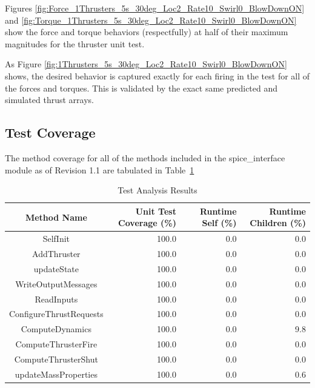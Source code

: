 \begin{enumerate}
	Figures \ref{fig:Force_1Thrusters_5s_30deg_Loc2_Rate10_Swirl0_BlowDownON} and \ref{fig:Torque_1Thrusters_5s_30deg_Loc2_Rate10_Swirl0_BlowDownON} show the force and torque behaviors (respectfully) at half of their maximum magnitudes for the thruster unit test.

	
	
	

	As Figure \ref{fig:1Thrusters_5s_30deg_Loc2_Rate10_Swirl0_BlowDownON} shows, the desired behavior is captured exactly for each
	firing in the test for all of the forces and torques. This is validated by the exact same predicted and simulated thrust arrays.



\end{enumerate}




\subsection{Test Coverage}
The method coverage for all of the methods included in the spice\_interface
module as of Revision 1.1 are tabulated in Table~\ref{tab:cov_met}

\begin{table}[htbp]
	\caption{Test Analysis Results}
	\label{tab:cov_met}
	\centering \fontsize{10}{10}\selectfont
	\begin{tabular}{c | r | r | r} %
		\hline
		Method Name    & Unit Test Coverage (\%) & Runtime Self (\%) & Runtime Children (\%) \\
		\hline
		SelfInit & 100.0 & 0.0 & 0.0 \\
		AddThruster & 100.0 & 0.0 & 0.0 \\
		updateState & 100.0 & 0.0 & 0.0 \\
		WriteOutputMessages & 100.0 & 0.0 & 0.0 \\
		ReadInputs & 100.0 & 0.0 & 0.0 \\
		ConfigureThrustRequests & 100.0 & 0.0 & 0.0 \\
		ComputeDynamics & 100.0 & 0.0 & 9.8 \\
		ComputeThrusterFire & 100.0 & 0.0 & 0.0 \\
		ComputeThrusterShut & 100.0 & 0.0 & 0.0 \\
		updateMassProperties & 100.0 & 0.0 & 0.6 \\
		\hline
	\end{tabular}
\end{table}

